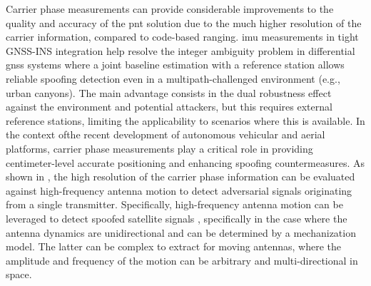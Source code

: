 Carrier phase measurements can provide considerable improvements to the quality and accuracy of the \gls{pnt} solution due to the much higher resolution of the carrier information, compared to code-based ranging. \gls{imu} measurements in tight GNSS-INS integration help resolve the integer ambiguity problem in differential \gls{gnss} systems where a joint baseline estimation with a reference station allows reliable spoofing detection even in a multipath-challenged environment (e.g., urban canyons). The main advantage consists in the dual robustness effect against the environment and potential attackers, but this requires external reference stations, limiting the applicability to scenarios where this is available. In the context ofthe  recent development of autonomous vehicular and aerial platforms, carrier phase measurements play a critical role in providing centimeter-level accurate positioning and enhancing spoofing countermeasures. As shown in \cite{WOS:000375213003001,Clements2022CarrierphaseAI,Hu_Bian_Ji_Li_2018,WOS:000356331204003}, the high resolution of the carrier phase information can be evaluated against high-frequency antenna motion to detect adversarial signals originating from a single transmitter. 
Specifically, high-frequency antenna motion can be leveraged to detect spoofed satellite signals \cite{WOS:000375213003001}, specifically in the case where the antenna dynamics are unidirectional and can be determined by a mechanization model. The latter can be complex to extract for moving antennas, where the amplitude and frequency of the motion can be arbitrary and multi-directional in space.